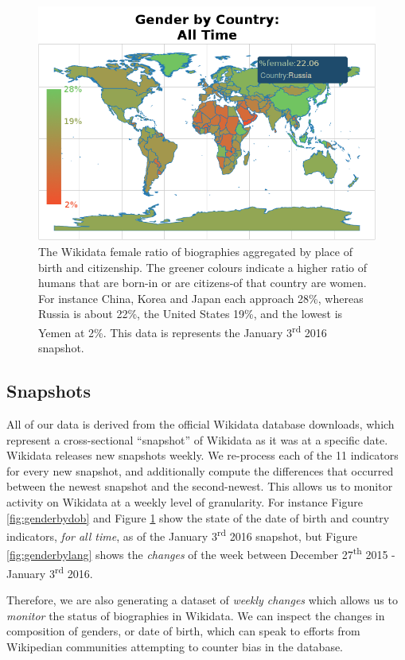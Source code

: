 \documentclass{sig-alternate-05-2015}
\begin{document}
\begin{figure}
\includegraphics[width=\columnwidth]{figures/genderbycountry.png} 
\caption{The Wikidata female ratio of biographies aggregated by place of birth and citizenship. The greener colours indicate a higher ratio of humans that are born-in or are citizens-of that country are women. For instance China, Korea and Japan each approach 28\%, whereas Russia is about 22\%, the United States 19\%, and the lowest is Yemen at 2\%. This data is represents the January 3\textsuperscript{rd} 2016 snapshot.}
\label{fig:genderbycountry}
\end{figure}


\subsection{Snapshots}
All of our data is derived from the official Wikidata database downloads, which represent a cross-sectional ``snapshot'' of Wikidata as it was at a specific date. Wikidata releases new snapshots weekly. We re-process each of the 11 indicators for every new snapshot, and additionally compute the differences that occurred between the newest snapshot and the second-newest. This allows us to monitor activity on Wikidata at a weekly level of granularity. For instance Figure  \ref{fig:genderbydob} and Figure \ref{fig:genderbycountry} show the state of the date of birth and country indicators, \textit{for all time}, as of the January 3\textsuperscript{rd} 2016 snapshot, but Figure \ref{fig:genderbylang} shows the \textit{changes} of the week between December 27\textsuperscript{th} 2015 - January 3\textsuperscript{rd} 2016.

Therefore, we are also generating a dataset of \textit{weekly changes} which allows us to \textit{monitor} the status of biographies in Wikidata. We can inspect the changes in composition of genders, or date of birth, which can speak to efforts from Wikipedian communities attempting to counter bias in the database. 
\end{document}
